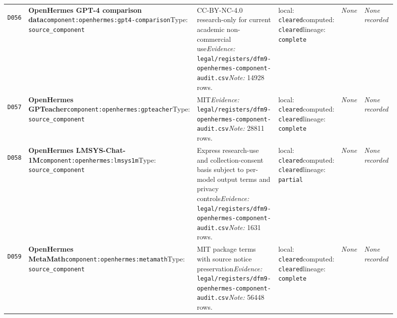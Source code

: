 \documentclass[9pt,a4paper]{article}
\newcommand{\depid}[1]{\hypertarget{dep:#1}{\texttt{#1}}}
\begin{document}
\begin{landscape}
\begin{longtable}{@{}L{0.035\linewidth}L{0.185\linewidth}L{0.27\linewidth}L{0.09\linewidth}L{0.10\linewidth}L{0.24\linewidth}@{}}
\depid{D056} & \textbf{OpenHermes GPT-4 comparison data}\newline \nolinkurl{component:openhermes:gpt4-comparison}\newline Type: \texttt{source\_component} & CC-BY-NC-4.0 research-only for current academic non-commercial use\newline \textit{Evidence:} \nolinkurl{legal/registers/dfm9-openhermes-component-audit.csv}\newline \textit{Note:} 14928 rows. & local: \texttt{cleared}\newline computed: \texttt{cleared}\newline lineage: \texttt{complete} & \textit{None} & \textit{None recorded} \\
\depid{D057} & \textbf{OpenHermes GPTeacher}\newline \nolinkurl{component:openhermes:gpteacher}\newline Type: \texttt{source\_component} & MIT\newline \textit{Evidence:} \nolinkurl{legal/registers/dfm9-openhermes-component-audit.csv}\newline \textit{Note:} 28811 rows. & local: \texttt{cleared}\newline computed: \texttt{cleared}\newline lineage: \texttt{complete} & \textit{None} & \textit{None recorded} \\
\depid{D058} & \textbf{OpenHermes LMSYS-Chat-1M}\newline \nolinkurl{component:openhermes:lmsys1m}\newline Type: \texttt{source\_component} & Express research-use and collection-consent basis subject to per-model output terms and privacy controls\newline \textit{Evidence:} \nolinkurl{legal/registers/dfm9-openhermes-component-audit.csv}\newline \textit{Note:} 1631 rows. & local: \texttt{cleared}\newline computed: \texttt{cleared}\newline lineage: \texttt{partial} & \textit{None} & \textit{None recorded} \\
\depid{D059} & \textbf{OpenHermes MetaMath}\newline \nolinkurl{component:openhermes:metamath}\newline Type: \texttt{source\_component} & MIT package terms with source notice preservation\newline \textit{Evidence:} \nolinkurl{legal/registers/dfm9-openhermes-component-audit.csv}\newline \textit{Note:} 56448 rows. & local: \texttt{cleared}\newline computed: \texttt{cleared}\newline lineage: \texttt{complete} & \textit{None} & \textit{None recorded} \\

\end{longtable}
\end{landscape}
\end{document}
